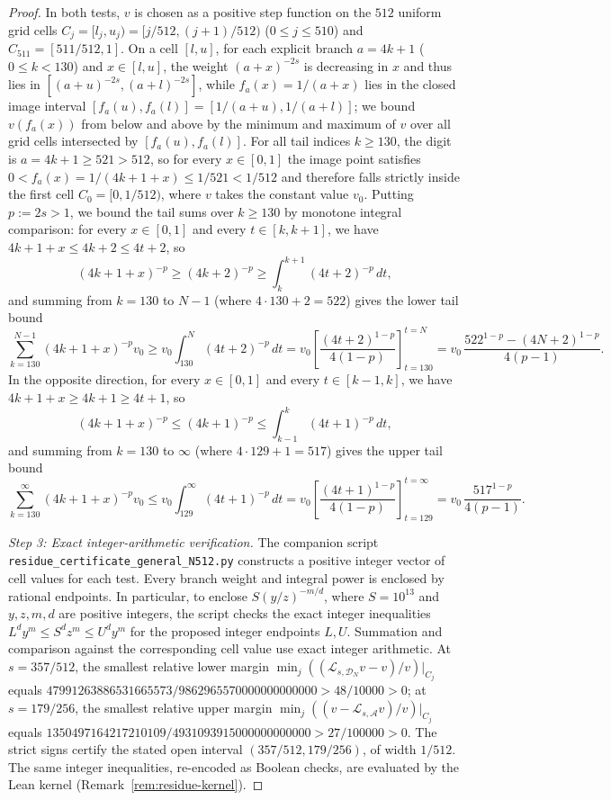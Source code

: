 \begin{proof}
In both tests, $v$ is chosen as a positive step function on the $512$ uniform
grid cells $C_j=[l_j,u_j)=[j/512,(j+1)/512)$ ($0\le j\le510$) and
$C_{511}=[511/512,1]$. On a cell $[l,u]$, for each explicit branch $a=4k+1$
($0\le k<130$) and $x\in[l,u]$, the weight $(a+x)^{-2s}$ is decreasing in $x$
and thus lies in $[(a+u)^{-2s},(a+l)^{-2s}]$, while $f_a(x)=1/(a+x)$ lies in the
closed image interval $[f_a(u),f_a(l)]=[1/(a+u),1/(a+l)]$; we bound $v(f_a(x))$
from below and above by the minimum and maximum of $v$ over all grid cells
intersected by $[f_a(u),f_a(l)]$. For all tail indices $k\ge130$, the digit is
$a=4k+1\ge521>512$, so for every $x\in[0,1]$ the image point satisfies
$0<f_a(x)=1/(4k+1+x)\le 1/521<1/512$ and therefore falls strictly inside the
first cell $C_0=[0,1/512)$, where $v$ takes the constant value $v_0$. Putting
$p:=2s>1$, we bound the tail sums over $k\ge130$ by monotone integral comparison:
for every $x\in[0,1]$ and every $t\in[k,k+1]$, we have
$4k+1+x\le 4k+2\le 4t+2$, so
\[
(4k+1+x)^{-p}\ge(4k+2)^{-p}\ge\int_k^{k+1}(4t+2)^{-p}\,dt,
\]
and summing from $k=130$ to $N-1$ (where $4\cdot130+2=522$) gives the lower tail
bound
\[
 \sum_{k=130}^{N-1}(4k+1+x)^{-p}v_0
 \ge v_0\int_{130}^N(4t+2)^{-p}\,dt
 =v_0\left[\frac{(4t+2)^{1-p}}{4(1-p)}\right]_{t=130}^{t=N}
 =v_0\,\frac{522^{1-p}-(4N+2)^{1-p}}{4(p-1)}.
\]
In the opposite direction, for every $x\in[0,1]$ and every $t\in[k-1,k]$, we
have $4k+1+x\ge 4k+1\ge 4t+1$, so
\[
(4k+1+x)^{-p}\le(4k+1)^{-p}\le\int_{k-1}^k(4t+1)^{-p}\,dt,
\]
and summing from $k=130$ to $\infty$ (where $4\cdot129+1=517$) gives the upper
tail bound
\[
 \sum_{k=130}^{\infty}(4k+1+x)^{-p}v_0
 \le v_0\int_{129}^\infty(4t+1)^{-p}\,dt
 =v_0\left[\frac{(4t+1)^{1-p}}{4(1-p)}\right]_{t=129}^{t=\infty}
 =v_0\,\frac{517^{1-p}}{4(p-1)} .
\]

\emph{Step 3: Exact integer-arithmetic verification.}
The companion script \texttt{residue\_\allowbreak certificate\_\allowbreak general\_\allowbreak N512.py} constructs a
positive integer vector of cell values for each test. Every branch
weight and integral power is enclosed by rational endpoints. In
particular, to enclose $S(y/z)^{-m/d}$, where $S=10^{13}$ and
$y,z,m,d$ are positive integers, the script checks the exact
integer inequalities $L^d y^m\le S^d z^m\le U^d y^m$ for the proposed
integer endpoints $L,U$. Summation and comparison against the
corresponding cell value use exact integer arithmetic. At $s=357/512$, the
smallest relative lower margin $\min_j((\mathcal L_{s,\mathcal D_N}v-v)/v)|_{C_j}$
equals
$47991263886531665573/9862965570000000000000>48/10000>0$; at $s=179/256$, the
smallest relative upper margin $\min_j((v-\mathcal L_{s,\mathcal A}v)/v)|_{C_j}$
equals
$1350497164217210109/4931093915000000000000>27/100000>0$. The
strict signs certify the stated open interval $(357/512,179/256)$, of width
$1/512$. The same integer inequalities, re-encoded as Boolean checks, are
evaluated by the Lean kernel (Remark~\ref{rem:residue-kernel}).
\end{proof}

